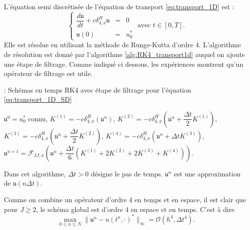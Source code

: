L'équation semi discrétisée de l'équation de transport \eqref{eq:transport_1D} est :
\begin{equation}
\left\lbrace
\begin{array}{rcl}
\dfrac{d \mathfrak{u}}{dt} + c \delta_{4,x}^H \mathfrak{u}& = &0 \\
\mathfrak{u}(0) & = & u_0^*
\end{array}
\text{ avec } t \in [0,T].
\right.
\label{eq:transport_1D_SD}
\end{equation}
Elle est résolue en utilisant la méthode de Runge-Kutta d'ordre 4. L'algorithme de résolution est donné par l'algorithme \ref{alg:RK4_transport1d} auquel on ajoute une étape de filtrage. Comme indiqué ci dessous, les expériences montrent qu'un opérateur de filtrage \cite{Visbal2002} est utile.
\begin{center}
\begin{minipage}[H]{12cm}
  \begin{algorithm}[H]
    \caption{: Schémas en temps RK4 avec étape de filtrage pour l'équation \eqref{eq:transport_1D_SD}}\label{alg:RK4_transport1d}
    \begin{algorithmic}[1]
    \State $\mathfrak{u}^0 = u_0^*$ connu,
             \State  $K^{(1)} = - c \delta_{4,x}^H \left( \mathfrak{u}^n \right)$,
             \State  $K^{(2)} = - c \delta_{4,x}^H \left( \mathfrak{u}^n + \dfrac{\Delta t}{2} K^{(1)}\right)$,
             \State  $K^{(3)} = - c \delta_{4,x}^H \left( \mathfrak{u}^n + \dfrac{\Delta t}{2} K^{(2)}\right)$,
             \State  $K^{(4)} = - c \delta_{4,x}^H \left( \mathfrak{u}^n + \Delta t K^{(3)}\right)$,  
             \State  $\mathfrak{u}^{n+1} = \mathcal{F}_{2J,x}\left( \mathfrak{u}^n  + \dfrac{\Delta t}{6} \left( K^{(1)} + 2 K^{(2)} + 2 K^{(3)} + K^{(4)} \right) \right)$.
            \EndFor
    \end{algorithmic}
    \end{algorithm}
\end{minipage}
\end{center}
Dans cet algorithme, $\Delta t > 0$ désigne le pas de temps. $\mathfrak{u}^n$ est une approximation de $\mathfrak{u}(n \Delta t)$.

Comme on combine un opérateur d'ordre 4 en temps et en espace, il est clair que pour $J \geq 2$, le schéma global est d'ordre 4 en espace et en temps. C'est à dire
\begin{equation}
\max_{0 \leq n \leq N} \| \mathfrak{u}^n - u(t^n,\cdot)^* \|_{\infty} = \mathcal{O} \left( h^4 , \Delta t^4 \right).
\end{equation}




